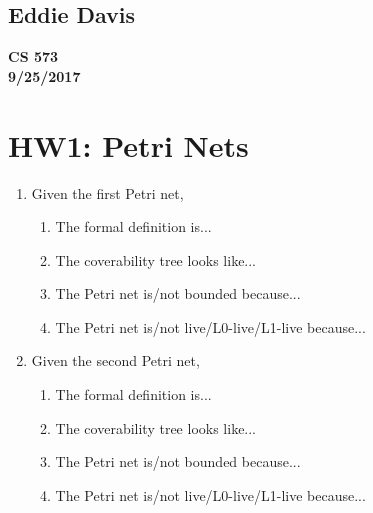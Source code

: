 \documentclass{bsu-ms}
\begin{document}
\subsection*{Eddie Davis}
\textbf{CS 573}\\
\textbf{9/25/2017}\\

\section*{HW1: Petri Nets}

\begin{enumerate}
	\item Given the first Petri net,
	\begin{enumerate}[label=(\alph*)]
		\item The formal definition is...
		\item The coverability tree looks like...
		\item The Petri net is/not bounded because...
		\item The Petri net is/not live/L0-live/L1-live because...
	\end{enumerate}
	
	\item Given the second Petri net,
	\begin{enumerate}[label=(\alph*)]
		\item The formal definition is...
		\item The coverability tree looks like...
		\item The Petri net is/not bounded because...
		\item The Petri net is/not live/L0-live/L1-live because...
	\end{enumerate}
\end{enumerate}
\end{document}
